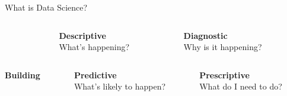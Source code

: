 \begin{frame}{What is Data Science?}
{\begin{columns}[c]
\begin{column}{0.25\textwidth}
\begin{center}
                \end{center}
            \end{column}
            \begin{column}{0.375\textwidth}
                \begin{center}
                    \textbf{Descriptive} \\
                    What's happening?
                \end{center}
            \end{column}
            \begin{column}{0.375\textwidth}
                \begin{center}
                    \textbf{Diagnostic} \\
                    Why is it happening?
                \end{center}
            \end{column}
        \end{columns}
        \vfill
        \begin{columns}[c]
            \begin{column}{0.25\textwidth}
                \begin{center}
                    \Large\bf%
                    Building
                \end{center}
            \end{column}
            \begin{column}{0.375\textwidth}
                \begin{center}
                    \textbf{Predictive} \\
                    What's likely to happen?
                \end{center}
            \end{column}
            \begin{column}{0.375\textwidth}
                \begin{center}
                   \textbf{Prescriptive} \\
                   What do I need to do?
                \end{center}
            \end{column}
        \end{columns}}
\end{frame}


